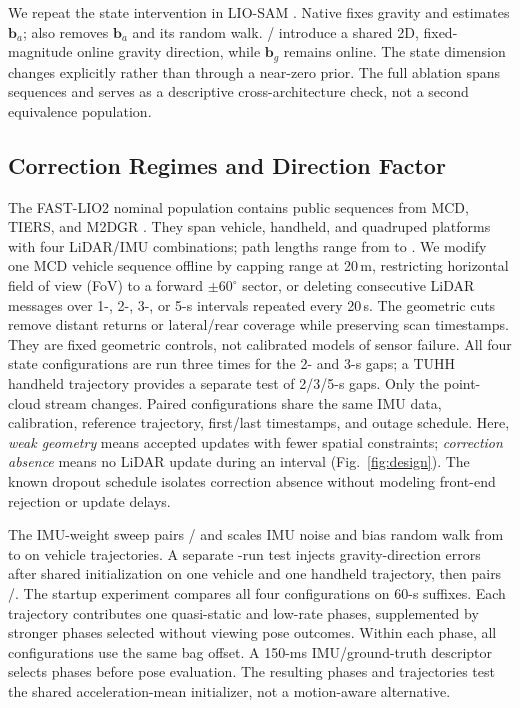We repeat the state intervention in LIO-SAM \cite{shan2020liosam}. Native
\lsFGBA{} fixes gravity and estimates $\mathbf b_a$; \lsFGBZ{} also removes
$\mathbf b_a$ and its random walk. \lsGEBA{}/\lsGEBZ{} introduce a shared 2D,
fixed-magnitude online gravity direction, while $\mathbf b_g$ remains online.
The state dimension changes explicitly rather than through a near-zero prior.
The full ablation spans \NumLioSamSeq{} sequences and serves as a descriptive
cross-architecture check, not a second equivalence population.

\subsection{Correction Regimes and Direction Factor}
The FAST-LIO2 nominal population contains \NumCoreSeq{} public sequences from
MCD, TIERS, and M2DGR \cite{nguyen2024mcd,sier2023tiers,yin2022m2dgr}. They span
vehicle, handheld, and quadruped platforms with four LiDAR/IMU combinations;
path lengths range from \MinPath{} to \MaxPath{}. We modify one MCD vehicle
sequence offline by capping range at 20\,m, restricting horizontal field of
view (FoV) to a forward $\pm60^\circ$ sector, or deleting consecutive LiDAR messages over
1-, 2-, 3-, or 5-s intervals repeated every 20\,s.
The geometric cuts remove distant returns or lateral/rear coverage while
preserving scan timestamps. They are fixed geometric controls, not calibrated
models of sensor failure.
All four state configurations are run three times for the 2- and 3-s gaps;
a TUHH handheld trajectory provides a separate test of 2/3/5-s gaps.
Only the point-cloud stream changes. Paired configurations share the same IMU
data, calibration, reference trajectory, first/last timestamps, and outage
schedule. Here, \emph{weak geometry} means accepted updates with fewer spatial
constraints; \emph{correction absence} means no LiDAR update during an interval
(Fig.~\ref{fig:design}). The known dropout schedule isolates correction absence
without modeling front-end rejection or update delays.

The IMU-weight sweep pairs \methodA{}/\methodG{} and scales IMU noise and bias
random walk from \ImuNoiseMin{} to \ImuNoiseMax{} on \NumImuStressSeq{}
vehicle trajectories. A separate \NumInitStressRuns{}-run test injects
\InitStressAngles{} gravity-direction errors after shared initialization on one
vehicle and one handheld trajectory, then pairs \methodA{}/\methodG{}.
The startup experiment compares all four configurations on
60-s suffixes. Each trajectory contributes one quasi-static and
\NumDynamicInitPhases{} low-rate phases, supplemented by
\NumFastDynamicInitPairs{} stronger phases selected without viewing pose
outcomes. Within each phase, all configurations use the same bag offset.
A 150-ms IMU/ground-truth descriptor selects phases before pose evaluation. The resulting
\NumDynamicFactorialPhases{} phases and \NumDynamicFactorialRuns{} trajectories
test the shared acceleration-mean initializer, not a motion-aware alternative.


